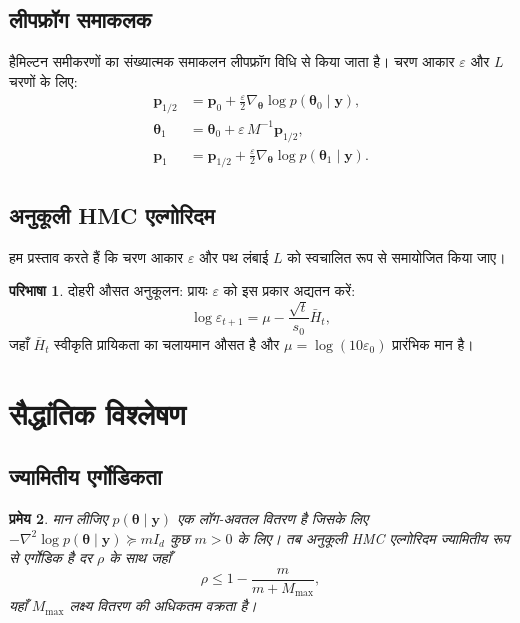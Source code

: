 \documentclass[12pt,a4paper]{article}
\theoremstyle{plain}
\newtheorem{theorem}{प्रमेय}[section]
\theoremstyle{definition}
\newtheorem{definition}[theorem]{परिभाषा}
\theoremstyle{remark}
\begin{document}
\subsection{लीपफ्रॉग समाकलक}

हैमिल्टन समीकरणों का संख्यात्मक समाकलन लीपफ्रॉग विधि
से किया जाता है। चरण आकार $\varepsilon$ और $L$ चरणों के लिए:
\begin{align}
\mathbf{p}_{1/2} &= \mathbf{p}_0 + \frac{\varepsilon}{2} \nabla_{\bm{\theta}} \log p(\bm{\theta}_0 \mid \mathbf{y}), \label{eq:leapfrog1} \\
\bm{\theta}_1 &= \bm{\theta}_0 + \varepsilon \, M^{-1} \mathbf{p}_{1/2}, \label{eq:leapfrog2} \\
\mathbf{p}_1 &= \mathbf{p}_{1/2} + \frac{\varepsilon}{2} \nabla_{\bm{\theta}} \log p(\bm{\theta}_1 \mid \mathbf{y}). \label{eq:leapfrog3}
\end{align}

\subsection{अनुकूली HMC एल्गोरिदम}

हम प्रस्ताव करते हैं कि चरण आकार $\varepsilon$ और पथ लंबाई $L$
को स्वचालित रूप से समायोजित किया जाए।

\begin{definition}
\label{def:dual_averaging}
दोहरी औसत अनुकूलन: प्राय‍ः $\varepsilon$ को इस प्रकार अद्यतन करें:
\begin{equation}
\label{eq:dual_avg}
\log \varepsilon_{t+1} = \mu - \frac{\sqrt{t}}{s_0} \bar{H}_t,
\end{equation}
जहाँ $\bar{H}_t$ स्वीकृति प्रायिकता का चलायमान औसत है और
$\mu = \log(10 \varepsilon_0)$ प्रारंभिक मान है।
\end{definition}

\section{सैद्धांतिक विश्लेषण}
\label{sec:theory}

\subsection{ज्यामितीय एर्गोडिकता}

\begin{theorem}
\label{thm:geometric}
मान लीजिए $p(\bm{\theta} \mid \mathbf{y})$ एक लॉग-अवतल वितरण है
जिसके लिए $-\nabla^2 \log p(\bm{\theta} \mid \mathbf{y}) \succeq m I_d$
कुछ $m > 0$ के लिए। तब अनुकूली HMC एल्गोरिदम ज्यामितीय
रूप से एर्गोडिक है दर $\rho$ के साथ जहाँ
\begin{equation}
\label{eq:rate}
\rho \leq 1 - \frac{m}{m + M_{\max}},
\end{equation}
यहाँ $M_{\max}$ लक्ष्य वितरण की अधिकतम वक्रता है।
\end{theorem}
\end{document}
